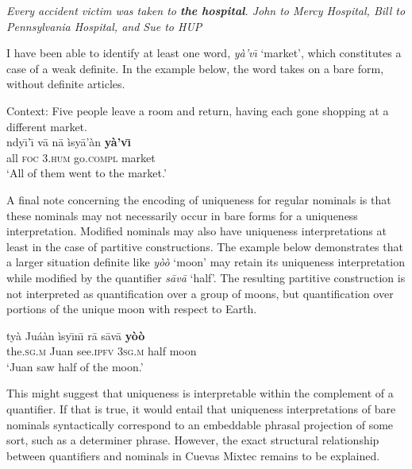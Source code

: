 \documentclass[output=paper,modfonts,nonflat]{langsci/langscibook}
\begin{document}
\ea {}\label{ex:cisneros:63}
\textit{Every accident victim was taken to \textbf{the hospital}. {\op}John to Mercy Hospital, Bill to Pennsylvania Hospital, and Sue to HUP{\cp}} \citep[3]{Schwarz2014}
\z 

I have been able to identify at least one word, \textit{y\`a'v\=\i} `market', which constitutes a case of a weak definite.  In the example below, the word takes on a bare form, without definite articles.

\ea {}\label{ex:cisneros:64}
Context: Five people leave a room and return, having each gone shopping at a different market. \\
\gll
{\llap{\checkmark~}}{\ob}ndy\=\i'\=\i{} v\=a n\=a{\cb} \`isy\=a'\`an \textbf{y\`a'v\=\i}\\
{\db}all \textsc{foc} 3.\textsc{hum} go.\textsc{compl} market\\
\glt
`All of them went to the market.'
\z

A final note concerning the encoding of uniqueness for regular nominals is that these nominals may not necessarily occur in bare forms for a uniqueness interpretation.  Modified nominals may also have uniqueness interpretations at least in the case of partitive constructions.  The example below demonstrates that a larger situation definite like \textit{y\`o\`o} `moon' may retain its uniqueness interpretation while modified by the quantifier \textit{s\=av\=a} `half'.  The resulting partitive construction is not interpreted as quantification over a group of moons, but quantification over portions of the unique moon with respect to Earth. 

\ea {}\label{ex:cisneros:65}
\gll
{\ob}ty\`a Ju\'a\`an{\cb} \`isy\=\i n\=\i{} r\=a {\ob}s\=av\=a \textbf{y\`o\`o}{\cb}\\
{\db}the.\textsc{sg.m} Juan see.\textsc{ipfv} 3\textsc{sg.m} {\db}half moon\\
\glt
`Juan saw half of the moon.'
\z 

This might suggest that uniqueness is interpretable within the complement of a quantifier.  If that is true, it would entail that uniqueness interpretations of bare nominals syntactically correspond to an embeddable phrasal projection of some sort, such as a determiner phrase.  However, the exact structural relationship between quantifiers and nominals in Cuevas Mixtec remains to be explained.
\end{document}
